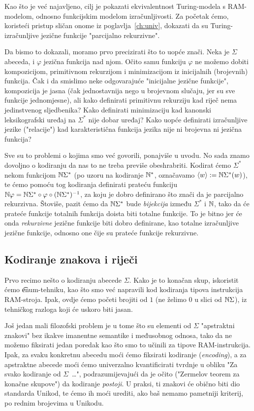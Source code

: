 Kao što je već najavljeno, cilj je pokazati ekvivalentnost Turing-modela s RAM-modelom, odnosno funkcijskim modelom izračunljivosti. Za početak ćemo, koristeći pristup sličan onome iz poglavlja~\ref{ch:univ}, dokazati da su Turing-izračunljive jezične funkcije "parcijalno rekurzivne".

Da bismo to dokazali, moramo prvo precizirati što to uopće znači. Neka je $\Sigma$ abeceda, i $\varphi$ jezična funkcija nad njom. Očito samu funkciju $\varphi$ ne možemo dobiti kompozicijom, primitivnom rekurzijom i minimizacijom iz inicijalnih (brojevnih) funkcija. Čak i da smislimo neke odgovarajuće "inicijalne jezične funkcije", kompozicija je jasna (čak jednostavnija nego u brojevnom slučaju, jer su sve funkcije jednomjesne), ali kako definirati primitivnu rekurziju kad riječ nema jedinstvenog sljedbenika? Kako definirati minimizaciju kad kanonski leksikografski uređaj na $\Sigma^*$ nije dobar uređaj? Kako uopće definirati izračunljive jezike ("relacije") kad karakteristična funkcija jezika nije ni brojevna ni jezična funkcija?

Sve su to problemi o kojima smo već govorili, ponajviše u uvodu. No sada znamo dovoljno o kodiranju da nas to ne treba previše obeshrabriti. Kodirat ćemo $\Sigma^*$ nekom funkcijom ${\mathbb N}\Sigma^*$ (po uzoru na kodiranje ${\mathbb N}^*$, označavamo $\langle w\rangle:={\mathbb N}\Sigma^*(w)$), te ćemo pomoću tog kodiranja definirati prateću funkciju ${\mathbb N}\varphi={\mathbb N}\Sigma^*\circ\varphi\circ({\mathbb N}\Sigma^*)^{-1}$, za koju je dobro definirano što znači da je parcijalno rekurzivna.
Štoviše, pazit ćemo da ${\mathbb N}\Sigma^*$ bude \emph{bijekcija} između $\Sigma^*$ i ${\mathbb N}$, tako da će prateće funkcije totalnih funkcija doista biti totalne funkcije. To je bitno jer će onda \emph{rekurzivne} jezične funkcije biti dobro definirane, kao totalne izračunljive jezične funkcije, odnosno one čije su prateće funkcije rekurzivne.

\subsection{Kodiranje znakova i riječi}\label{sec:kSigma}

Prvo recimo nešto o kodiranju abecede $\Sigma$. Kako je to konačan skup, iskoristit ćemo \t{enum}-tehniku, kao što smo već napravili kod kodiranja tipova instrukcija RAM-stroja. Ipak, ovdje ćemo početi brojiti od $1$ (ne želimo $0$ u slici od ${\mathbb N}\Sigma$), iz tehničkog razloga koji će uskoro biti jasan.

Još jedan mali filozofski problem je u tome što su elementi od $\Sigma$ "apstraktni znakovi" bez ikakve imanentne semantike i međusobnog odnosa, tako da ne možemo fiksirati jedan poredak kao što smo to učinili za tipove RAM-instrukcija. Ipak, za svaku konkretnu abecedu moći ćemo fiksirati kodiranje (\emph{encoding}), a za apstraktne abecede moći ćemo univerzalno kvantificirati tvrdnje u obliku "Za svako kodiranje od $\Sigma$~\ldots", podrazumijevajući da je očito ("Zermelov teorem za konačne skupove") da kodiranje \emph{postoji}. U praksi, ti znakovi će obično biti dio standarda Unikod, te ćemo ih moći urediti, ako baš nemamo pametniji kriterij, po rednim brojevima u Unikodu.

